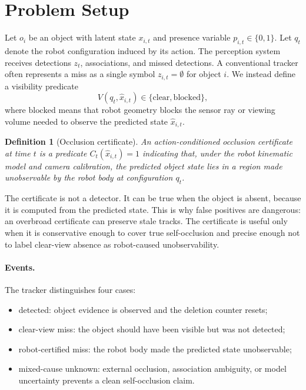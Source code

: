 \documentclass{article}
\newtheorem{definition}{Definition}
\newcommand{\clear}{\mathrm{clear}}
\newcommand{\blocked}{\mathrm{blocked}}
\begin{document}
\section{Problem Setup}

Let $o_i$ be an object with latent state $x_{i,t}$ and presence variable
$p_{i,t}\in\{0,1\}$. Let $q_t$ denote the robot configuration induced by its
action. The perception system receives detections $z_t$, associations, and
missed detections. A conventional tracker often represents a miss as a single
symbol $z_{i,t}=\emptyset$ for object $i$. We instead define a visibility
predicate
\begin{equation}
V(q_t,\hat x_{i,t})\in\{\clear,\blocked\},
\end{equation}
where $\blocked$ means that robot geometry blocks the sensor ray or viewing
volume needed to observe the predicted state $\hat x_{i,t}$.

\begin{definition}[Occlusion certificate]
An action-conditioned occlusion certificate at time $t$ is a predicate
$C_t(\hat x_{i,t})=1$ indicating that, under the robot kinematic model and
camera calibration, the predicted object state lies in a region made
unobservable by the robot body at configuration $q_t$.
\end{definition}

The certificate is not a detector. It can be true when the object is absent,
because it is computed from the predicted state. This is why false positives
are dangerous: an overbroad certificate can preserve stale tracks. The
certificate is useful only when it is conservative enough to cover true
self-occlusion and precise enough not to label clear-view absence as
robot-caused unobservability.

\paragraph{Events.}
The tracker distinguishes four cases:
\begin{itemize}[leftmargin=*]
\item detected: object evidence is observed and the deletion counter resets;
\item clear-view miss: the object should have been visible but was not detected;
\item robot-certified miss: the robot body made the predicted state unobservable;
\item mixed-cause unknown: external occlusion, association ambiguity, or model
uncertainty prevents a clean self-occlusion claim.
\end{itemize}
\end{document}
